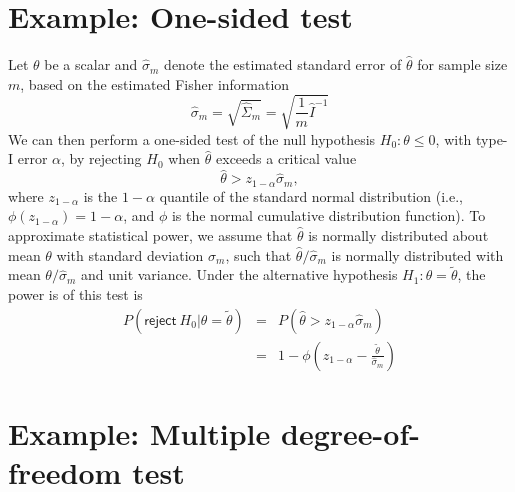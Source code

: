 \documentclass{article}
\begin{document}
\section{Example: One-sided test}
\noindent Let $\theta$ be a scalar and $\hat{\sigma}_m$ denote the estimated standard error of $\hat{\theta}$ for sample size $m$, based on the estimated Fisher information
$$
\hat{\sigma}_m = \sqrt{\hat{\Sigma}_m} = \sqrt{\frac{1}{m}\hat{I}^{-1}}
$$
We can then perform a one-sided test of the null hypothesis $H_0: \theta \leq 0$, with type-I error $\alpha$, by rejecting $H_0$ when $\hat{\theta}$ exceeds a critical value
$$
\hat{\theta} > z_{1-\alpha}\hat{\sigma}_m,
$$
where $z_{1-\alpha}$ is the $1-\alpha$ quantile of the standard normal distribution (i.e., $\phi(z_{1-\alpha}) = 1-\alpha$, and $\phi$ is the normal cumulative distribution function). To approximate statistical power, we assume that $\hat{\theta}$ is normally distributed about mean $\theta$ with standard deviation $\hat{\sigma}_m$, such that $\hat{\theta}/\hat{\sigma}_m$ is normally distributed with mean $\theta/\hat{\sigma}_m$ and unit variance. Under the alternative hypothesis $H_1: \theta = \tilde{\theta}$, the power is of this test is 
\begin{eqnarray}
P(\mathsf{reject}\ H_0 | \theta = \tilde{\theta}) &=& P\left(\hat{\theta} > z_{1-\alpha}\hat{\sigma}_m\right) \nonumber \\
&=& 1-\phi\left(z_{1-\alpha} - \frac{\tilde{\theta}}{\hat{\sigma}_m}\right) \nonumber
\end{eqnarray}

\section{Example: Multiple degree-of-freedom test}
\end{document}
